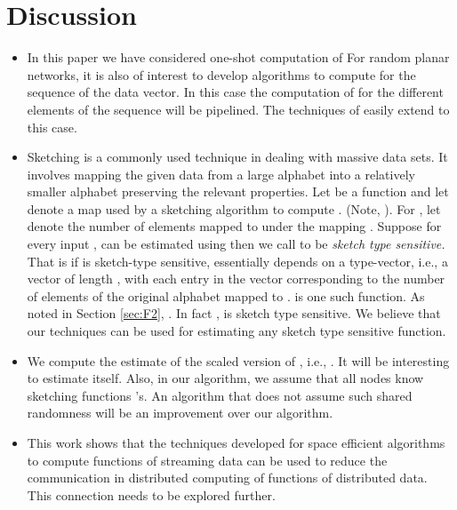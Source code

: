 \documentclass[10pt,twosided,a4paper,draft,onecolumn]{article}
\begin{document}
\section{Discussion}
\label{sec:dis}
\begin{itemize}

\item In this paper we have considered one-shot computation of 
  For random planar networks, it is also of interest to develop
  algorithms to compute  for the sequence of  the data
  vector. In this case the computation of  for the different
  elements of the sequence will be pipelined. The techniques of
  \cite{Kamath08,Iyer11} easily extend to this case.

\item Sketching is a commonly used technique in dealing with massive
  data sets.  It involves mapping the given data from a large alphabet
  into a relatively smaller alphabet preserving the relevant
  properties. Let  be a function and let  denote a map used by a sketching
  algorithm to compute . (Note, ).  For ,
  let  denote the number of elements mapped to  under
  the mapping .  Suppose for every input ,  can be estimated
  using  then we
  call  to be \emph{sketch type sensitive.}  That is if  is
  sketch-type sensitive,  essentially depends on a type-vector,
  i.e., a vector of length , with each entry  in
  the vector corresponding to the number of elements of the original
  alphabet mapped to .   is one such function. As noted in
  Section \ref{sec:F2}, .  In fact ,  is sketch type sensitive. We believe that our techniques
  can be used for estimating any sketch type sensitive function.

\item We compute the estimate of the scaled version of , i.e.,
  . It will be interesting to estimate  itself. Also, in
  our algorithm, we assume that all nodes know sketching functions
  's.  An algorithm that does not assume such shared
  randomness will be an improvement over our algorithm.

\item This work shows that the techniques developed for space
  efficient algorithms to compute functions of streaming data can be
  used to reduce the communication in distributed computing of
  functions of distributed data. This connection needs to be explored
  further.
\end{itemize}



\end{document}

